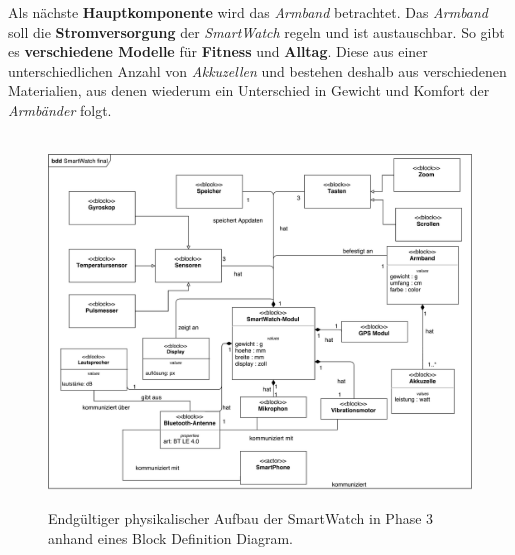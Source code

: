 Als nächste \textbf{Hauptkomponente} wird das \textit{Armband} betrachtet. Das \textit{Armband} soll die \textbf{Stromversorgung} der \textit{SmartWatch} regeln und ist austauschbar. So gibt es \textbf{verschiedene Modelle} für \textbf{Fitness} und \textbf{Alltag}. Diese aus einer unterschiedlichen Anzahl von \textit{Akkuzellen} und bestehen deshalb aus verschiedenen Materialien, aus denen wiederum ein Unterschied in Gewicht und Komfort der \textit{Armbänder} folgt.
\begin{figure}[h]
\centering\
\includegraphics[width=\textwidth]{img/block2}
\caption{Endgültiger physikalischer Aufbau der SmartWatch in Phase 3 anhand eines Block Definition Diagram.}\label{fig:block2}
\end{figure}